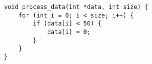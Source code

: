 \begin{lstlisting}[style=CStyle]
void process_data(int *data, int size) {
    for (int i = 0; i < size; i++) {
        if (data[i] < 50) {
            data[i] = 0;
        }
    }
}
\end{lstlisting}